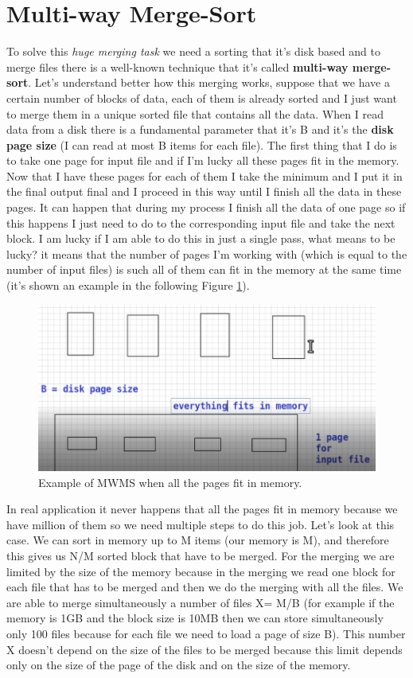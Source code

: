 \section{Multi-way Merge-Sort}
To solve this \textit{huge merging task} we need a sorting that it's disk based and to merge files there is a well-known technique that it's called \textbf{multi-way merge-sort}.\newline
Let's understand better how this merging works, suppose that we have a certain number of blocks of data, each of them is already sorted and I just want to merge them in a unique sorted file that contains all the data. When I read data from a disk there is a fundamental parameter that it's B and it's the \textbf{disk page size} (I can read at most B items for each file). The first thing that I do is to take one page for input file and if I'm lucky all these pages fit in the memory. Now that I have these pages for each of them I take the minimum and I put it in the final output final and I proceed in this way until I finish all the data in these pages. It can happen that during my process I finish all the data of one page so if this happens I just need to do to the corresponding input file and take the next block. I am lucky if I am able to do this in just a single pass, what means to be lucky? it means that the number of pages I'm working with (which is equal to the number of input files) is such all of them can fit in the memory at the same time (it's shown an example in the following Figure \ref{fig:singlestep}).\newline
\begin{figure}
    \centering
    \includegraphics[width=0.75\linewidth]{images/singlestep.png}
    \caption{Example of MWMS when all the pages fit in memory.}
    \label{fig:singlestep}
\end{figure}
In real application it never happens that all the pages fit in memory because we have million of them so we need multiple steps to do this job. Let's look at this case.\newline
We can sort in memory up to M items (our memory is M), and therefore this gives us N/M sorted block that have to be merged. For the merging we are limited by the size of the memory because in the merging we read one block for each file that has to be merged and then we do the merging with all the files. We are able to merge simultaneously a number of files X= M/B (for example if the memory is 1GB and the block size is 10MB then we can store simultaneously only 100 files because for each file we need to load a page of size B). This number X doesn't depend on the size of the files to be merged because this limit depends only on the size of the page of the disk and on the size of the memory.\newline
